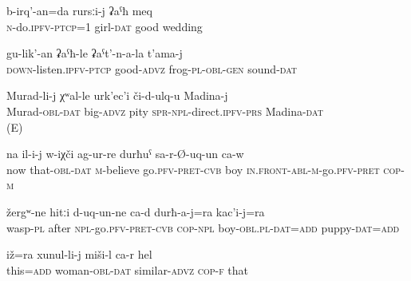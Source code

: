 \begin{enumerate}
\begin{exe}
		\ex	\label{ex:(I) will make a big weeding for my daughter}
		\gll	b-irq'-an=da	rursːi-j	ʡaˁħ	meq \\
			\textsc{n}-do.\textsc{ipfv}-\textsc{ptcp}=1	girl-\textsc{dat}	good	wedding\\
		\glt	{}
		
		\ex	\label{ex:listening carefully to the sounds of the frogs}
		\gll	gu-lik'-an	ʡaˁħ-le	ʡaˁt'-n-a-la	t'ama-j\\
			\textsc{down}-listen.\textsc{ipfv}-\textsc{ptcp}	good-\textsc{advz}	frog-\textsc{pl}-\textsc{obl}-\textsc{gen}	sound-\textsc{dat}\\
		\glt	{}
		
		\ex	\label{ex:Murad feels very sorry for Madina}
		\gll	Murad-li-j	χʷal-le		urk'ec'i	či-d-ulq-u	Madina-j \\
			Murad-\textsc{obl}-\textsc{dat}		big-\textsc{advz}	pity	\textsc{spr}-\textsc{npl}-direct.\textsc{ipfv}-\textsc{prs}	Madina-\textsc{dat}\\
		\glt	{} (E)
		
		\ex	\label{ex:Now the boy believed it (=the mouse) and ran away}
		\gll	na	il-i-j	w-iχči	ag-ur-re	durħuˁ	sa-r-Ø-uq-un ca-w\\
			now	that-\textsc{obl}-\textsc{dat}	\textsc{m}-believe	go.\textsc{pfv}-\textsc{pret}-\textsc{cvb}	boy	\textsc{in.front}-\textsc{abl}-\textsc{m}-go.\textsc{pfv}-\textsc{pret} \textsc{cop-m}\\
		\glt	{}
		
		\ex	\label{ex:The wasps flew after the boy and the puppy}
		\gll	žergʷ-ne	hitːi	d-uq-un-ne ca-d	durħ-a-j=ra	kac'i-j=ra \\
			wasp-\textsc{pl} after \textsc{npl}-go.\textsc{pfv}-\textsc{pret}-\textsc{cvb} \textsc{cop-npl}	boy-\textsc{obl}.\textsc{pl}-\textsc{dat}=\textsc{add}	puppy-\textsc{dat}=\textsc{add}\\
		\glt	{}
	
		\ex	\label{ex:This also (=the person on a picture) one resembles a woman}
		\gll	iž=ra	xunul-li-j	miši-l	ca-r	hel\\
			this=\textsc{add}	woman-\textsc{obl}-\textsc{dat}	similar-\textsc{advz}	\textsc{cop-f}	that\\
		\glt	{}
	\end{exe}


\end{enumerate}
